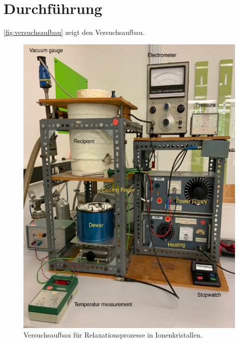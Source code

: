 \section{Durchführung}
\label{sec:Durchführung}

\autoref{fig:versuchsaufbau} zeigt den Versuchsaufbau. 

\begin{figure}[H]
    \centering
    \includegraphics[width=\textwidth]{bilder/versuchsaufbau.png}
    \caption{Versuchsaufbau für Relaxationsprozesse in Ionenkristallen.}
    \label{fig:versuchsaufbau}
\end{figure}

